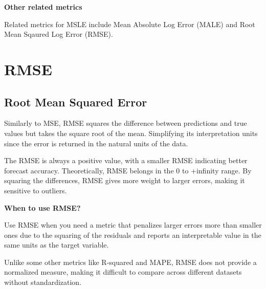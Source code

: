 \textbf{Other related metrics}

Related metrics for MSLE include Mean Absolute Log Error (MALE) and Root Mean Sqaured Log Error (RMSE). 

\clearpage
\thispagestyle{regressionstyle}
\section{RMSE}
\subsection{Root Mean Squared Error}

Similarly to MSE, RMSE squares the difference between predictions and true values but takes the square root of the mean.
Simplifying its interpretation units since the error is returned in the natural units of the data.

\begin{center}
\end{center}

The RMSE is always a positive value, with a smaller RMSE indicating better forecast accuracy.
Theoretically, RMSE belongs in the 0 to +infinity range. By squaring the differences, RMSE gives more weight to larger errors, making it sensitive to outliers.

\textbf{When to use RMSE?}

Use RMSE when you need a metric that penalizes larger errors more than smaller ones due to the squaring of the residuals and reports an
interpretable value in the same units as the target variable.

{
    \item Unlike some other metrics like R-squared and MAPE, RMSE does not provide a normalized measure, making it difficult to compare across different datasets without standardization.
}

